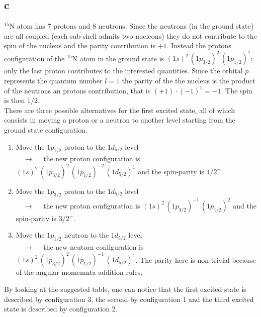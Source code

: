 \subsection*{c}
$^{15}$N atom has 7 protons and 8 neutrons. Since the neutrons (in the ground state) are all coupled (each sub-shell admits two nucleons) they do not contribute to  the spin of the nucleus and the parity contribution is $+1$. Instead the protons configuration
of the $^{15}$N atom in the ground state is $(1s)^2 \, (1p_{3/2})^2 \, (1p_{1/2})^1$: only the last proton contributes to the interested quantities. Since the orbital $p$ represents the quantum number $l=1$ the parity of the the nucleus is the product of the neutrons 
an protons contribution, that is $(+1) \cdot (-1)^1 = -1$. The spin is then $1/2$. \\
There are three possible alternatives for the first excited state, all of which consists in moving a proton or a neutron to another level starting from the ground state configuration.
\begin{enumerate}
    \item Move the $1p_{1/2}$ proton to the $1d_{5/2}$ level \\ $\quad \longrightarrow \quad$ the new proton configuration is $(1s)^2 \, (1p_{3/2})^2 \, (1p_{1/2})^{-2} \, (1d_{5/2})^1$ and the spin-parity is $1/2^+$.
    \item Move the $1p_{3/2}$ proton to the $1d_{5/2}$ level \\ $\quad \longrightarrow \quad$ the new proton configuration is $(1s)^2 \, (1p_{3/2})^{-1} \, (1p_{1/2})^2$ and the spin-parity is $3/2^-$.
    \item Move the $1p_{1/2}$ neutron to the $1d_{5/2}$ level \\ $\quad \longrightarrow \quad $ the new neutorn configuration is $(1s)^2 \, (1p_{3/2})^2 \, (1p_{1/2})^{-1} \, (1d_{5/2})^1$. The parity here is non-trivial because of the angular momemnta addition rules.
\end{enumerate}
By looking at the suggested table, one can notice that the first excited state is described by configuration $3$, the second by configuration $1$ and the third excited state is described by configuration $2$.


